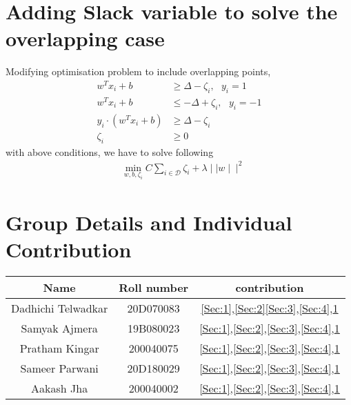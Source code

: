 \documentclass[11pt, twosides]{article}
\begin{document}
\section{Adding Slack variable to solve the overlapping case}
\label{Sec:5}
Modifying optimisation problem to include overlapping points,
\begin{align*}
    w^Tx_i + b &\ge \Delta - \zeta_i, \, \, \, \, y_i = 1\\
    w^Tx_i +b &\le -\Delta + \zeta_i,\, \, \, \, y_i = -1\\
        y_i \cdot \left(w^Tx_i + b \right) &\ge \Delta - \zeta_i \\
\zeta_i &\ge 0
\end{align*}
with above conditions, we have to solve following
\begin{align*}
    &\min_{w,b,\zeta_i} C\sum_{i \in \mathcal{D}} \zeta_i
 + \lambda \mid \mid w \mid \mid ^2 
 \end{align*}


\section{Group Details and Individual Contribution}
\begin{table}[H]
    \centering
    \begin{tabular}{|c|c|c|}
     \hline
        Name & Roll number & contribution \\
        \hline
        Dadhichi Telwadkar & 20D070083 & 
        \ref{Sec:1},\ref{Sec:2}\ref{Sec:3},\ref{Sec:4},\ref{Sec:5}\\
         \hline
         Samyak Ajmera & 19B080023 &
        \ref{Sec:1},\ref{Sec:2},\ref{Sec:3},\ref{Sec:4},\ref{Sec:5}\\
         \hline
        Pratham Kingar & 200040075 & \ref{Sec:1},\ref{Sec:2},\ref{Sec:3},\ref{Sec:4},\ref{Sec:5}\\
         \hline
         Sameer Parwani & 20D180029 & \ref{Sec:1},\ref{Sec:2},\ref{Sec:3},\ref{Sec:4},\ref{Sec:5}\\
         \hline
        Aakash Jha & 200040002 & \ref{Sec:1},\ref{Sec:2},\ref{Sec:3},\ref{Sec:4},\ref{Sec:5}\\
        
    \hline
    \end{tabular}
    \label{tab:my_label}
\end{table}
\end{document}
